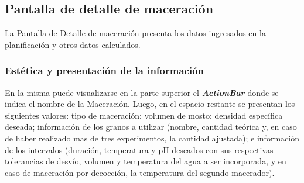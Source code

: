         \subsection{Pantalla de detalle de maceración}
        \label{DescripPantallaDetalleMaceración}
            \par La Pantalla de Detalle de maceración presenta los datos ingresados en la planificación y otros datos calculados.
            
            \subsubsection{Estética y presentación de la información}
            \par En la misma puede visualizarse en la parte superior el \textbf{\textit{\gls{ActionBar}}} donde se indica el nombre de la Maceración. Luego, en el espacio restante se presentan los siguientes valores: tipo de maceración; volumen de mosto; densidad específica deseada; información de los granos a utilizar (nombre, cantidad teórica y, en caso de haber realizado mas de tres experimentos, la cantidad ajustada); e información de los intervalos (duración, temperatura y pH deseados con sus respectivas tolerancias de desvío, volumen y temperatura del agua a ser incorporada, y en caso de maceración por decocción, la temperatura del segundo macerador).
